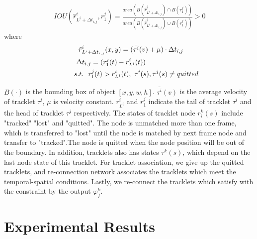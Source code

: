 \documentclass[5pt]{article}
\begin{document}
\vspace{-0.1cm}
\begin{eqnarray}
&IOU(\hat{r}_{L^i+\Delta t_{i,j}}^i,r_1^j)=\frac{area(B(\hat{r}_{L^i+\Delta t_{i,j}}^i)\cap B(r_1^j))}{area(B(\hat{r}_{L^i+\Delta t_{i,j}}^i)\cup B(r_1^j))}>0\ \ \
\end{eqnarray}
where
\vspace{-0.3cm}
\begin{eqnarray}
\begin{split}
&\quad\quad\ \ \hat{r}_{L^i+\Delta t_{i,j}}^i(x,y)= (\bar{\tau^i}(v)+\mu)\cdot \Delta t_{i,j} \\
&\quad\quad \ \Delta t_{i,j}= (r_1^j(t)-r_{L^i}^i(t)) \\
&\qquad s.t. \ \ r_1^j(t)> r_{L^i}^i(t),\ \tau^i(s),\tau^j(s)\neq quitted
\end{split}
\vspace{-0.3cm}
\end{eqnarray}


\vspace{-0.1cm}
$B(\cdot)$ is the bounding box of object $[x,y,w,h]$. $\bar{\tau^i}(v)$ is the average velocity of tracklet $\tau^i$, $\mu$ is velocity constant. $r_{L^i}^i$ and $r_1^j$ indicate the tail of tracklet $\tau^i$ and the head of tracklet $\tau^j$ respectively. The states of tracklet node  $r_i^k(s)$ include "tracked" "lost" and "quitted". The node is unmatched more than one frame, which is transferred to "lost" until the node is matched by next frame node and transfer to "tracked".The node is quitted when the node position will be out of the boundary. In addition, tracklets also has states $\tau^k(s)$, which depend on the last node state of this tracklet. For tracklet association, we give up the quitted tracklets, and re-connection network associates the tracklets which meet the temporal-spatial conditions. Lastly, we re-connect the tracklets which satisfy with the constraint by the output $\varphi_f^k$.
\vspace{-0.2cm}
\section{Experimental Results}
\vspace{-0.1cm}
\end{document}
